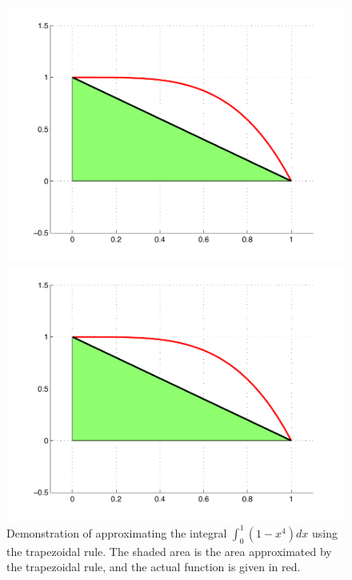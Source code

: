 \begin{figure}
\begin{center}
\begin{matlab}
\includegraphics[scale=.4]{./FiguresMAT/Trapezoid.pdf}
\end{matlab}
\begin{python}
\includegraphics[scale=.4]{./FiguresMAT/Trapezoid.pdf}
\end{python}
\caption{Demonstration of approximating the integral $\int_0^1 (1-x^4)dx$ using the trapezoidal rule. The shaded area is the area approximated by the trapezoidal rule, and the actual function is given in red.}
\label{Fig:Trapezoidal}
\end{center}
\end{figure}

